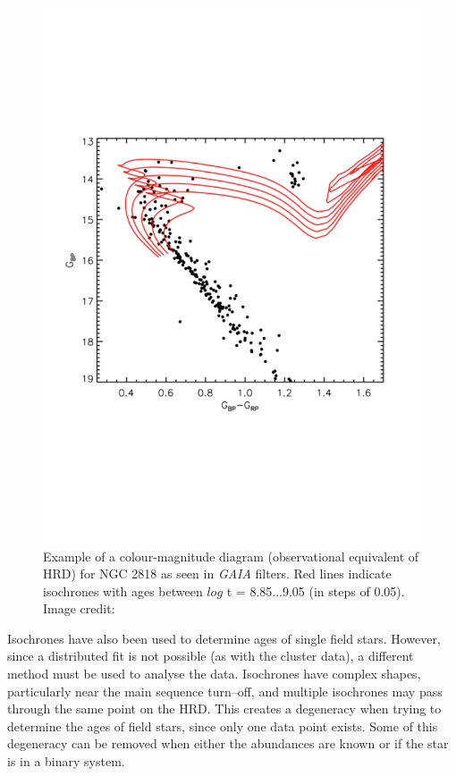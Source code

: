\begin{figure}
    \centering
    \includegraphics[scale=0.45]{Figures/1-Introduction/gaia_OC_example.pdf}
    \caption[Example of model isochrones for a cluster]{Example of a colour-magnitude diagram (observational equivalent of HRD) for NGC 2818 as seen in \textit{GAIA} filters. Red lines indicate isochrones with ages between $log$ t = 8.85...9.05 (in steps of 0.05). Image credit: \citet{Bastian_etal_2018}}
    \label{fig:OC_isochrone_example}
\end{figure}

Isochrones have also been used to determine ages of single field stars. However, since a distributed fit is not possible (as with the cluster data), a different method must be used to analyse the data. Isochrones have complex shapes, particularly near the main sequence turn--off, and multiple isochrones may pass through the same point on the HRD. This creates a degeneracy when trying to determine the ages of field stars, since only one data point exists. Some of this degeneracy can be removed when either the abundances are known or if the star is in a binary system.

